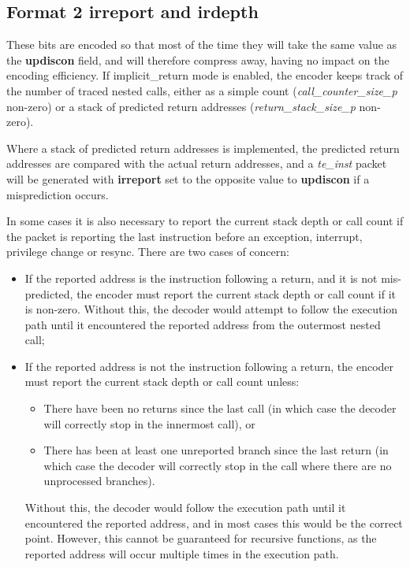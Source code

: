 \subsection{Format 2 \textbf{irreport} and \textbf{irdepth}} \label{sec:irxx}
These bits are encoded so that most of the time they will take the same value as the \textbf{updiscon} field,
and will therefore compress away, having no impact on the encoding efficiency.  If implicit\_return mode is enabled, the
encoder keeps track of the number of traced nested calls, either as a simple count (\textit{call\_counter\_size\_p} 
non-zero) or a stack of predicted return addresses (\textit{return\_stack\_size\_p} non-zero).  

Where a stack of predicted return addresses is implemented, the predicted return addresses are compared with the actual 
return addresses, and a \textit{te\_inst} packet will be generated with \textbf{irreport} set to the opposite value to
\textbf{updiscon} if a misprediction occurs.  

In some cases it is also necessary to report the current stack depth or call count if the packet is reporting the last 
instruction before an exception, interrupt, privilege change or resync.  There are two cases of concern:

\begin{itemize}
  \item If the reported address is the instruction following a return, and it is not mis-predicted, the encoder must 
    report the current stack depth or call count if it is non-zero.  Without this, the decoder would attempt to follow 
    the execution path until it encountered the reported address from the outermost nested call;  
  \item If the reported address is not the instruction following a return, the encoder must report the current stack 
    depth or call count unless:
    \begin{itemize}
      \item There have been no returns since the last call (in which case the decoder will correctly stop in the 
        innermost call), or
      \item There has been at least one unreported branch since the last return (in which case the decoder will correctly
        stop in the call where there are no unprocessed branches).
    \end{itemize}
    Without this, the decoder would follow the execution path until it encountered the reported address, and in most cases 
    this would be the correct point.  However, this cannot be guaranteed for recursive functions, as the reported address 
    will occur multiple times in the execution path.  
\end{itemize}


